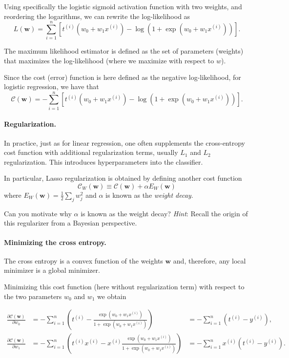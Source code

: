 \documentclass[%
oneside,                 %
final,                   %
10pt]{article}
\newenvironment{question_mdfboxadmon}[1][]{
\begin{question_mdfboxmdframed}[frametitle=#1]
}
{
\end{question_mdfboxmdframed}
}
\begin{document}
Using specifically the logistic sigmoid activation function with two weights, and reordering the logarithms, we can rewrite the log-likelihood as
\[
L(\boldsymbol{w}) = \sum_{i=1}^n  \left[ t^{(i)}(w_0+w_1 x^{(i)}) -\log{(1+\exp{(w_0+w_1x^{(i)})})} \right].
\]

The maximum likelihood estimator is defined as the set of parameters (weights) that maximizes the log-likelihood (where we maximize with respect to $w$).

Since the cost (error) function is here defined as the negative log-likelihood, for logistic regression, we have that
\[
\mathcal{C}(\boldsymbol{w})=-\sum_{i=1}^n  \left[ t^{(i)} (w_0+w_1x^{(i)}) -\log{ \left( 1+\exp{(w_0+w_1x^{(i)})} \right) } \right].
\]

\paragraph{Regularization.}
In practice, just as for linear regression, one often supplements the cross-entropy cost function with additional regularization terms, usually $L_1$ and $L_2$ regularization. This introduces hyperparameters into the classifier.

In particular, Lasso regularization is obtained by defining another cost function
\[
\mathcal{C}_W (\boldsymbol{w}) \equiv \mathcal{C} (\boldsymbol{w}) + \alpha E_W (\boldsymbol{w})
\]
where $E_W (\boldsymbol{w}) = \frac{1}{2} \sum_j w_j^2$ and $\alpha$ is known as the \emph{weight decay}.


\begin{question_mdfboxadmon}[Question]
Can you motivate why $\alpha$ is known as the weight decay? \emph{Hint}: Recall the origin of this regularizer from a Bayesian perspective.
\end{question_mdfboxadmon} %




\paragraph{Minimizing the cross entropy.}
The cross entropy is a convex function of the weights $\boldsymbol{w}$ and,
therefore, any local minimizer is a global minimizer. 


Minimizing this cost function (here without regularization term) with respect to the two parameters $w_0$ and $w_1$ we obtain

\begin{align*}
\frac{\partial \mathcal{C}(\boldsymbol{w})}{\partial w_0} 
&= -\sum_{i=1}^n  \left(t^{(i)} -\frac{\exp{(w_0+w_1x^{(i)})}}{1+\exp{(w_0+w_1x^{(i)})}}\right)
&= -\sum_{i=1}^n  \left(t^{(i)} - y^{(i)} \right), \\
\frac{\partial \mathcal{C}(\boldsymbol{w})}{\partial w_1} 
&= -\sum_{i=1}^n  \left(t^{(i)} x^{(i)} -x^{(i)}\frac{\exp{(w_0+w_1x^{(i)})}}{1+\exp{(w_0+w_1x^{(i)})}}\right)
&= -\sum_{i=1}^n  x^{(i)} \left(t^{(i)} - y^{(i)} \right).
\end{align*}
\end{document}
